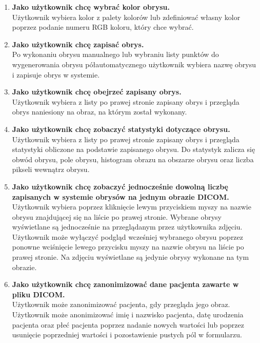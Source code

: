 \documentclass[a4paper,11pt,twoside]{report}
\theoremstyle{definition}
\begin{document}
\begin{enumerate}
\item \textbf {Jako użytkownik chcę wybrać kolor obrysu.} \\
Użytkownik wybiera kolor z palety kolorów lub zdefiniować własny kolor poprzez podanie numeru RGB koloru, który chce wybrać.

\item \textbf {Jako użytkownik chcę zapisać obrys.} \\
Po wykonaniu obrysu manualnego lub wybraniu listy punktów do wygenerowania obrysu półautomatycznego użytkownik wybiera nazwę obrysu i zapisuje obrys w systemie.

\item \textbf {Jako użytkownik chcę obejrzeć zapisany obrys.} \\
Użytkownik wybiera z listy po prawej stronie zapisany obrys i przegląda obrys naniesiony na obraz, na którym został wykonany.

\item \textbf {Jako użytkownik chcę zobaczyć statystyki dotyczące obrysu.} \\
Użytkownik wybiera z listy po prawej stronie zapisany obrys i przegląda statystyki obliczone na podstawie zapisanego obrysu. Do statystyk zalicza się obwód obrysu, pole obrysu, histogram obrazu na obszarze obrysu oraz liczba pikseli wewnątrz obrysu.

\item \textbf {Jako użytkownik chcę zobaczyć jednocześnie dowolną liczbę zapisanych w systemie obrysów na jednym obrazie DICOM.} \\
Użytkownik wybiera poprzez kliknięcie lewym przyciskiem myszy na nazwie obrysu znajdującej się na liście po prawej stronie. Wybrane obrysy wyświetlane są jednocześnie na przeglądanym przez użytkownika zdjęciu. Użytkownik może wyłączyć podgląd wcześniej wybranego obrysu poprzez ponowne wciśnięcie lewego przycisku myszy na nazwie obrysu na liście po prawej stronie. Na zdjęciu wyświetlane są jedynie obrysy wykonane na tym obrazie.

\item \textbf {Jako użytkownik chcę zanonimizować dane pacjenta zawarte w pliku DICOM.} \\
Użytkownik może zanonimizować pacjenta, gdy przegląda jego obraz. Użytkownik może anonimizować imię i nazwisko pacjenta, datę urodzenia pacjenta oraz płeć pacjenta poprzez nadanie nowych wartości lub poprzez usunięcie poprzedniej wartości i pozostawienie pustych pól w formularzu.

\end{enumerate}
\end{document}
